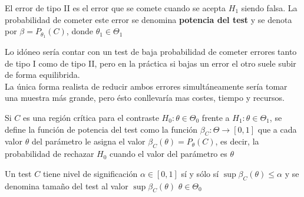 \begin{definición}
    El error de tipo II es el error que se comete cuando se acepta $H_{1}$ siendo falsa. La probabilidad de cometer este error se denomina \textbf{potencia del test} y se denota por $\beta=P_{\theta_{1}}(C)$, donde $\theta_{1} \in \Theta_{1}$
\end{definición}


\begin{observación}
    Lo idóneo sería contar con un test de baja probabilidad de cometer errores tanto de tipo I como de tipo II, pero en la práctica si bajas un error el otro suele subir de forma equilibrida. \\
    La única forma realista de reducir ambos errores simultáneamente sería tomar una muestra más grande, pero ésto conllevaría mas costes, tiempo y recursos. 
\end{observación}

\begin{definición} 
Si $C$ es una región crítica para el contraste $H_{0}: \theta \in \Theta_{0}$ frente a $H_{1}: \theta \in \Theta_{1}$, se define la función de potencia del test como la función $\beta_{C}: \Theta \rightarrow[0,1]$ que a cada valor $\theta$ del parámetro le asigna el valor $\beta_{C}(\theta)=P_{\theta}(C)$, es decir, la probabilidad de rechazar $H_{0}$ cuando el valor del parámetro es $\theta$
\end{definición}

\begin{definición} 
Un test $C$ tiene nivel de significación $\alpha \in[0,1]$ sí y sólo sí $\sup \beta_{C}(\theta) \leq \alpha$ y se denomina tamaño del test al valor $\sup \beta_{C}(\theta)$ $\theta \in \Theta_{0}$
\end{definición}

